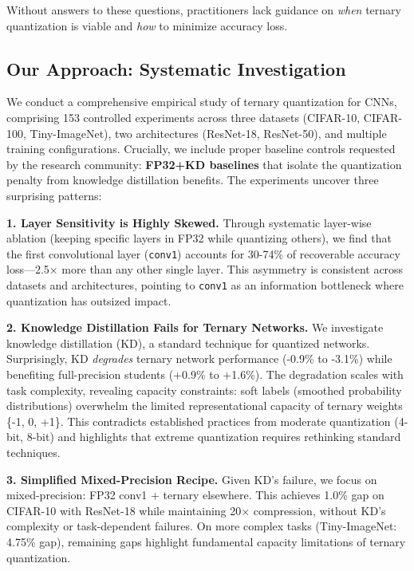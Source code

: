 Without answers to these questions, practitioners lack guidance on \textit{when} ternary quantization is viable and \textit{how} to minimize accuracy loss.

\subsection{Our Approach: Systematic Investigation}

We conduct a comprehensive empirical study of ternary quantization for CNNs, comprising 153 controlled experiments across three datasets (CIFAR-10, CIFAR-100, Tiny-ImageNet), two architectures (ResNet-18, ResNet-50), and multiple training configurations. Crucially, we include proper baseline controls requested by the research community: \textbf{FP32+KD baselines} that isolate the quantization penalty from knowledge distillation benefits. The experiments uncover three surprising patterns:

\textbf{1. Layer Sensitivity is Highly Skewed.} Through systematic layer-wise ablation (keeping specific layers in FP32 while quantizing others), we find that the first convolutional layer (\texttt{conv1}) accounts for 30-74\% of recoverable accuracy loss—2.5× more than any other single layer. This asymmetry is consistent across datasets and architectures, pointing to \texttt{conv1} as an information bottleneck where quantization has outsized impact.

\textbf{2. Knowledge Distillation Fails for Ternary Networks.} We investigate knowledge distillation (KD), a standard technique for quantized networks. Surprisingly, KD \textit{degrades} ternary network performance (-0.9\% to -3.1\%) while benefiting full-precision students (+0.9\% to +1.6\%). The degradation scales with task complexity, revealing capacity constraints: soft labels (smoothed probability distributions) overwhelm the limited representational capacity of ternary weights \{-1, 0, +1\}. This contradicts established practices from moderate quantization (4-bit, 8-bit) and highlights that extreme quantization requires rethinking standard techniques.

\textbf{3. Simplified Mixed-Precision Recipe.} Given KD's failure, we focus on mixed-precision: FP32 conv1 + ternary elsewhere. This achieves 1.0\% gap on CIFAR-10 with ResNet-18 while maintaining 20× compression, without KD's complexity or task-dependent failures. On more complex tasks (Tiny-ImageNet: 4.75\% gap), remaining gaps highlight fundamental capacity limitations of ternary quantization.

